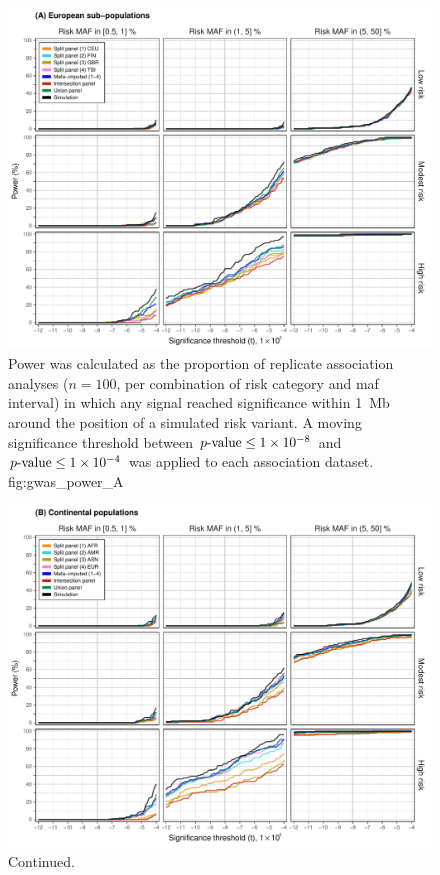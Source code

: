 

\begin{figure}[tb]
\includegraphics[width=\textwidth]{./img/ch2/association_power_A}
{Power was calculated as the proportion of replicate association analyses ($n=100$, per combination of risk category and \gls{maf} interval) in which any signal reached significance within 1~\gls{Mb} around the position of a simulated risk variant.
A moving significance threshold between ${\mbox{$p$-value}\leq\num{1e-8}}$ and ${\mbox{$p$-value}\leq\num{1e-4}}$ was applied to each association dataset.}
{fig:gwas_power_A}
\end{figure}



\begin{figure}[tb]
\ContinuedFloat
\includegraphics[width=\textwidth]{./img/ch2/association_power_B}
\caption[]{Continued.}
\label{fig:gwas_power_B}
\end{figure}



